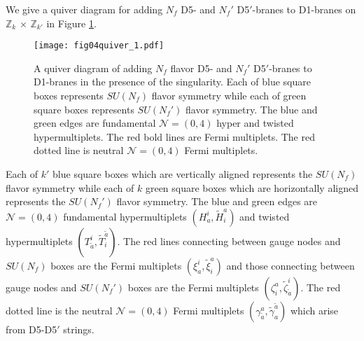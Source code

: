 \documentclass{article}
\numberwithin{equation}{section}
\begin{document}
We give a quiver diagram for 
adding $N_{f}$ D5- and $N_{f}'$ D5$'$-branes to D1-branes on $\mathbb{Z}_{k}$ $\times$ $\mathbb{Z}_{k'}$ 
in Figure \ref{fig04quiver_1}. 
\begin{figure}
\begin{center}
\texttt{[image: fig04quiver\_1.pdf]}
\caption{A quiver diagram of adding $N_{f}$ flavor D5- and $N_{f}'$ D5$'$-branes 
to D1-branes in the presence of the singularity. 
Each of blue square boxes represents $SU(N_{f})$ flavor symmetry 
while each of green square boxes represents $SU(N_{f}')$ flavor symmetry. 
The blue and green edges are fundamental $\mathcal{N}=(0,4)$ hyper and twisted hypermultiplets. 
The red bold lines are Fermi multiplets. 
The red dotted line is neutral $\mathcal{N}=(0,4)$ Fermi multiplets. }
\label{fig04quiver_1}
\end{center}
\end{figure}
Each of $k'$ blue square boxes which are vertically aligned represents the $SU(N_{f})$ flavor symmetry 
while each of $k$ green square boxes which are horizontally aligned represents the $SU(N_{f}')$ flavor symmetry. 
The blue and green edges are $\mathcal{N}=(0,4)$ fundamental hypermultiplets $(H^{i}_{a}, \widetilde{H}^{a}_{i})$
and twisted hypermultiplets $(T^{i}_{\tilde{a}}, \widetilde{T}_{i}^{\tilde{a}})$. 
The red lines connecting between gauge nodes and $SU(N_{f})$ boxes 
are the Fermi multiplets $(\xi_{a}^{i}, \widetilde{\xi}_{i}^{a})$ 
and those connecting between gauge nodes and $SU(N_{f}')$ boxes 
are the Fermi multiplets $(\zeta^{a}_{i}, \widetilde{\zeta}^{i}_{\tilde{a}})$. 
The red dotted line is the neutral $\mathcal{N}=(0,4)$ Fermi multiplets 
$(\gamma_{\tilde{a}}^{a}, \widetilde{\gamma}_{a}^{\tilde{a}})$ which arise from D5-D5$'$ strings.
\end{document}
